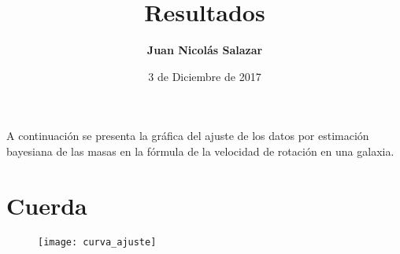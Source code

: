 \documentclass[letterpaper,11pt]{article}
\begin{document}

\title{\textbf{Resultados}}

\author[]{\textbf{Juan Nicolás Salazar}}
\date{3 de Diciembre de 2017}




\maketitle
 \noindent
A continuación se presenta la gráfica del ajuste de los datos por estimación bayesiana de las masas en la fórmula de la velocidad de rotación en una galaxia.

\section{Cuerda}

\begin{figure}[H]
    \centering
    \texttt{[image: curva\_ajuste]}
    \label{f1}
\end{figure}
\end{document}
